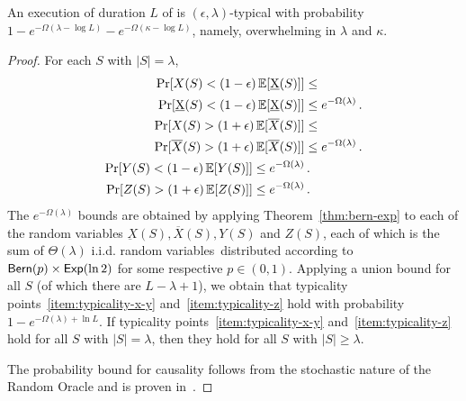 \begin{theorem}[Typicality]
  An execution of duration $L$ of \poem is $(\epsilon, \lambda)$-typical with
  probability $1 - e^{-\Omega(\lambda - \log L)} - e^{-\Omega(\kappa - \log L)}$,
  namely, overwhelming in $\lambda$ and $\kappa$.
\end{theorem}
\begin{proof}
  For each $S$ with $|S| = \lambda$,
  \begin{align*}
    \Pr[X(S) < (1 - \epsilon)\mathop{{}\mathbb{E}}[\underbar{X}(S)]] &\leq\\
    \Pr[\underbar{X}(S) < (1 - \epsilon)\mathop{{}\mathbb{E}}[\underbar{X}(S)]] &\leq
    e^{-\Omega(\lambda)} \,.\\
    \Pr[X(S) > (1 + \epsilon)\mathop{{}\mathbb{E}}[\overline{X}(S)]] &\leq\\
    \Pr[\overline{X}(S) > (1 + \epsilon)\mathop{{}\mathbb{E}}[\overline{X}(S)]] &\leq
    e^{-\Omega(\lambda)} \,.\\
    \Pr[Y(S) < (1 - \epsilon)\mathop{{}\mathbb{E}}[Y(S)]] \leq e^{-\Omega(\lambda)} &\,.\\
    \Pr[Z(S) > (1 + \epsilon)\mathop{{}\mathbb{E}}[Z(S)]] \leq e^{-\Omega(\lambda)} &\,.\\
  \end{align*}
  The $e^{-\Omega(\lambda)}$ bounds are obtained by applying
  Theorem~\ref{thm:bern-exp} to each of the random variables
  $\underbar{X}(S), \overline{X}(S), Y(S)$ and $Z(S)$, each
  of which is the sum of $\Theta(\lambda)$ i.i.d. random variables\
  distributed according to $\textsf{Bern}(p) \times \textsf{Exp}(\ln2)$ for
  some respective $p \in (0, 1)$.
  Applying a union bound for all $S$ (of which there are $L - \lambda + 1$),
  we obtain that typicality
  points~\ref{item:typicality-x-y} and~\ref{item:typicality-z}
  hold with probability $1 - e^{-\Omega(\lambda)+\ln L}$.
  If typicality points~\ref{item:typicality-x-y} and~\ref{item:typicality-z}
  hold for all $S$ with $|S| = \lambda$, then they hold for all $S$ with
  $|S| \geq \lambda$.


  The probability bound for causality follows from the stochastic nature
  of the Random Oracle and is proven in~\cite{backbone}.
  \Qed
\end{proof}

